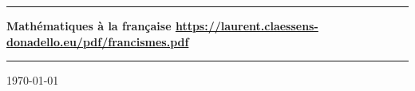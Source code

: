 
\thispagestyle{empty}
\begin{center}
  \begin{minipage}{15cm}
    \hrule\par
    \vspace{2mm}
    \begin{center}
        \Huge \bfseries Mathématiques à la française
    \normalsize
        \url{https://laurent.claessens-donadello.eu/pdf/francismes.pdf}
    \end{center}
    \hrule\par
  \end{minipage}
\end{center}

\vspace{2cm}

\begin{center}

    \vspace{1cm}

    \today\\
    \texttt{\GitCommitHexsha}


\end{center}

\vfill

 \LogoEtLicence

 \newpage
